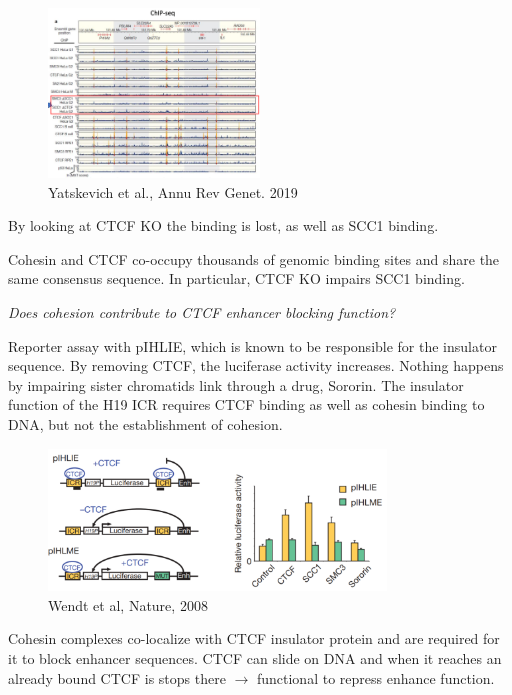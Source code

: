 \begin{figure}
\centering
\includegraphics[width=0.5\textwidth]{../_resources/Screenshot_2022-10-14_at_19-51-43.png}
\caption{Yatskevich et al., Annu Rev Genet. 2019}
\label{fig:chip}
\end{figure}

By looking at CTCF KO the binding is lost, as well as SCC1 binding.

Cohesin and CTCF co-occupy thousands of genomic binding sites and share the same consensus sequence. In particular, CTCF KO impairs SCC1 binding.

\emph{Does cohesion contribute to CTCF enhancer blocking function?}

Reporter assay with pIHLIE, which is known to be responsible for the insulator sequence. By removing CTCF, the luciferase activity increases. Nothing happens by impairing sister chromatids link through a drug, Sororin. The insulator function of the H19 ICR requires CTCF binding as well as cohesin binding to DNA, but not the establishment of cohesion.

\begin{figure}
\centering
\includegraphics[width=0.8\textwidth]{../_resources/Screenshot_2022-10-14_at_19-50-44.png}
\caption{Wendt et al, Nature, 2008}
\end{figure}

Cohesin complexes co-localize with CTCF insulator protein and are required for it to block enhancer sequences. CTCF can slide on DNA and when it reaches an already bound CTCF is stops there $\rightarrow$ functional to repress enhance function.


